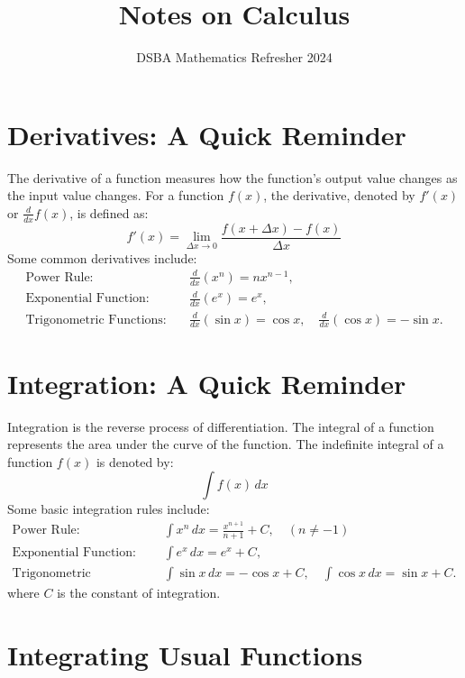 \documentclass[]{article}
\title{Notes on Calculus}
\author{DSBA Mathematics Refresher 2024}
\date{}
\begin{document}
	
	\maketitle
	
	\begin{abstract}
		
	\end{abstract}
	
	
	\section{Derivatives: A Quick Reminder}
	The derivative of a function measures how the function's output value changes as the input value changes. For a function \( f(x) \), the derivative, denoted by \( f'(x) \) or \( \frac{d}{dx}f(x) \), is defined as:
	\[
	f'(x) = \lim_{\Delta x \to 0} \frac{f(x+\Delta x) - f(x)}{\Delta x}
	\]
	Some common derivatives include:
	\begin{align*}
		\text{Power Rule:} & \quad \frac{d}{dx} \left( x^n \right) = nx^{n-1}, \\
		\text{Exponential Function:} & \quad \frac{d}{dx} \left( e^x \right) = e^x, \\
		\text{Trigonometric Functions:} & \quad \frac{d}{dx} \left( \sin x \right) = \cos x, \quad \frac{d}{dx} \left( \cos x \right) = -\sin x.
	\end{align*}
	
	\section{Integration: A Quick Reminder}
	Integration is the reverse process of differentiation. The integral of a function represents the area under the curve of the function. The indefinite integral of a function \( f(x) \) is denoted by:
	\[
	\int f(x)\,dx
	\]
	Some basic integration rules include:
	\begin{align*}
		\text{Power Rule:} & \quad \int x^n\,dx = \frac{x^{n+1}}{n+1} + C, \quad (n \neq -1) \\
		\text{Exponential Function:} & \quad \int e^x\,dx = e^x + C, \\
		\text{Trigonometric Functions:} & \quad \int \sin x\,dx = -\cos x + C, \quad \int \cos x\,dx = \sin x + C.
	\end{align*}
	where \( C \) is the constant of integration.
	
	\section{Integrating Usual Functions}
\end{document}
